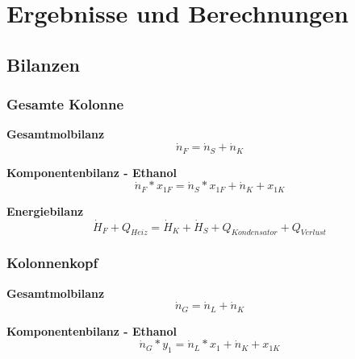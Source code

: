 \newpage
\section{Ergebnisse und Berechnungen}
\label{sec:ergebnisse}

\subsection{Bilanzen}
\subsubsection{Gesamte Kolonne}

\hspace{5mm}\textbf{Gesamtmolbilanz}\\
\begin{equation}\label{gl:gesamtmolbilanzKOLONNE}
\dot{n}_F=\dot{n}_S+\dot{n}_K
\end{equation}

\hspace{5mm}\textbf{Komponentenbilanz - Ethanol} \\
\begin{equation}\label{gl:komponentenbilanzKOLONNE}
\dot{n}_F*x_{1F}=\dot{n}_S*x_{1F}+\dot{n}_K+x_{1K}
\end{equation}

\hspace{5mm}\textbf{Energiebilanz}\\
\begin{equation}\label{gl:energiebilanzKOLONNE}
\dot{H}_F+Q_{Heiz}=\dot{H}_K+\dot{H}_S+Q_{Kondensator}+Q_{Verlust}
\end{equation}


\subsubsection{Kolonnenkopf}

\hspace{5mm}\textbf{Gesamtmolbilanz}\\
\begin{equation}
\dot{n}_G=\dot{n}_L+\dot{n}_K
\end{equation}

\hspace{5mm}\textbf{Komponentenbilanz - Ethanol} \\
\begin{equation}
\dot{n}_G*y_{1}=\dot{n}_L*x_{1}+\dot{n}_K+x_{1K}
\end{equation}

